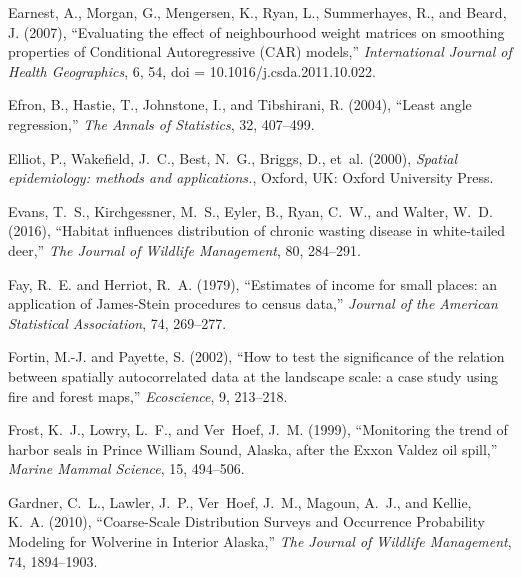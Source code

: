 \documentclass[11pt, titlepage]{article}\usepackage[]{graphicx}\usepackage[]{color}
\begin{document}
\begin{spacing}{1.9}
\begin{flushleft}
\begin{thebibliography}{126}
Earnest, A., Morgan, G., Mengersen, K., Ryan, L., Summerhayes, R., and Beard,
  J. (2007), \enquote{Evaluating the effect of neighbourhood weight matrices on
  smoothing properties of Conditional Autoregressive (CAR) models,}
  \textit{International Journal of Health Geographics}, 6, 54, doi =
  10.1016/j.csda.2011.10.022.

Efron, B., Hastie, T., Johnstone, I., and Tibshirani, R. (2004), \enquote{Least
  angle regression,} \textit{The Annals of Statistics}, 32, 407--499.

Elliot, P., Wakefield, J.~C., Best, N.~G., Briggs, D., et~al. (2000),
  \textit{Spatial epidemiology: methods and applications.}, Oxford, UK: Oxford
  University Press.

Evans, T.~S., Kirchgessner, M.~S., Eyler, B., Ryan, C.~W., and Walter, W.~D.
  (2016), \enquote{Habitat influences distribution of chronic wasting disease
  in white-tailed deer,} \textit{The Journal of Wildlife Management}, 80,
  284--291.

Fay, R.~E. and Herriot, R.~A. (1979), \enquote{Estimates of income for small
  places: an application of James-Stein procedures to census data,}
  \textit{Journal of the American Statistical Association}, 74, 269--277.

Fortin, M.-J. and Payette, S. (2002), \enquote{How to test the significance of
  the relation between spatially autocorrelated data at the landscape scale: a
  case study using fire and forest maps,} \textit{Ecoscience}, 9, 213--218.

Frost, K.~J., Lowry, L.~F., and Ver~Hoef, J.~M. (1999), \enquote{Monitoring the
  trend of harbor seals in Prince William Sound, Alaska, after the Exxon Valdez
  oil spill,} \textit{Marine Mammal Science}, 15, 494--506.

Gardner, C.~L., Lawler, J.~P., Ver~Hoef, J.~M., Magoun, A.~J., and Kellie,
  K.~A. (2010), \enquote{Coarse-Scale Distribution Surveys and Occurrence
  Probability Modeling for Wolverine in Interior Alaska,} \textit{The Journal
  of Wildlife Management}, 74, 1894--1903.


\end{thebibliography}
\end{flushleft}
\end{spacing}
\end{document}
